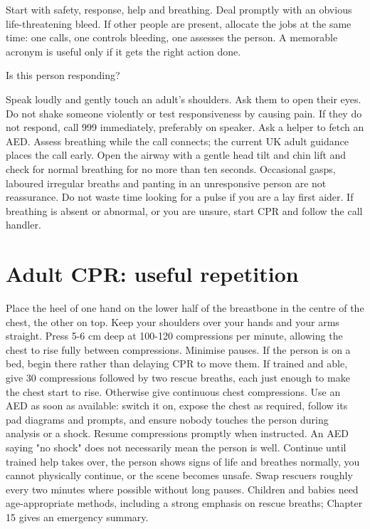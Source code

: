 \documentclass[10pt,openright]{book}
\begin{document}
Start with safety, response, help and breathing. Deal promptly with an obvious life-threatening bleed. If other people are present, allocate the jobs at the same time: one calls, one controls bleeding, one assesses the person. A memorable acronym is useful only if it gets the right action done.

Is this person responding?

Speak loudly and gently touch an adult's shoulders. Ask them to open their eyes. Do not shake someone violently or test responsiveness by causing pain. If they do not respond, call 999 immediately, preferably on speaker. Ask a helper to fetch an AED. Assess breathing while the call connects; the current UK adult guidance places the call early. Open the airway with a gentle head tilt and chin lift and check for normal breathing for no more than ten seconds. Occasional gasps, laboured irregular breaths and panting in an unresponsive person are not reassurance. Do not waste time looking for a pulse if you are a lay first aider. If breathing is absent or abnormal, or you are unsure, start CPR and follow the call handler.

\section*{Adult CPR: useful repetition}
Place the heel of one hand on the lower half of the breastbone in the centre of the chest, the other on top. Keep your shoulders over your hands and your arms straight. Press 5-6 cm deep at 100-120 compressions per minute, allowing the chest to rise fully between compressions. Minimise pauses. If the person is on a bed, begin there rather than delaying CPR to move them. If trained and able, give 30 compressions followed by two rescue breaths, each just enough to make the chest start to rise. Otherwise give continuous chest compressions. Use an AED as soon as available: switch it on, expose the chest as required, follow its pad diagrams and prompts, and ensure nobody touches the person during analysis or a shock. Resume compressions promptly when instructed. An AED saying "no shock" does not necessarily mean the person is well. Continue until trained help takes over, the person shows signs of life and breathes normally, you cannot physically continue, or the scene becomes unsafe. Swap rescuers roughly every two minutes where possible without long pauses. Children and babies need age-appropriate methods, including a strong emphasis on rescue breaths; Chapter 15 gives an emergency summary.
\end{document}
